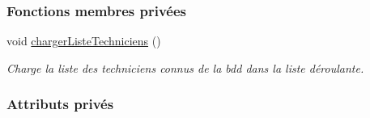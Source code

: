 \subsubsection*{Fonctions membres privées}
\begin{DoxyCompactItemize}
\item 
void \hyperlink{class_i_h_m_creation_campagne_a0648a6013cec5557150d0addf30e2bbc}{charger\+Liste\+Techniciens} ()
\begin{DoxyCompactList}\small\item\em Charge la liste des techniciens connus de la bdd dans la liste déroulante. \end{DoxyCompactList}\end{DoxyCompactItemize}
\subsubsection*{Attributs privés}
